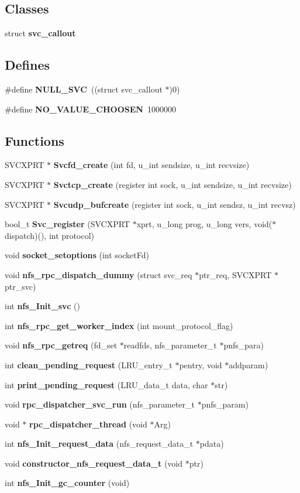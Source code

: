 \subsection*{Classes}
\begin{CompactItemize}
\item 
struct {\bf svc\_\-callout}
\end{CompactItemize}
\subsection*{Defines}
\begin{CompactItemize}
\item 
\#define {\bf NULL\_\-SVC}\ ((struct svc\_\-callout $\ast$)0)
\item 
\#define {\bf NO\_\-VALUE\_\-CHOOSEN}\ 1000000
\end{CompactItemize}
\subsection*{Functions}
\begin{CompactItemize}
\item 
SVCXPRT $\ast$ {\bf Svcfd\_\-create} (int fd, u\_\-int sendsize, u\_\-int recvsize)
\item 
SVCXPRT $\ast$ {\bf Svctcp\_\-create} (register int sock, u\_\-int sendsize, u\_\-int recvsize)
\item 
SVCXPRT $\ast$ {\bf Svcudp\_\-bufcreate} (register int sock, u\_\-int sendsz, u\_\-int recvsz)
\item 
bool\_\-t {\bf Svc\_\-register} (SVCXPRT $\ast$xprt, u\_\-long prog, u\_\-long vers, void($\ast$dispatch)(), int protocol)
\item 
void {\bf socket\_\-setoptions} (int socket\-Fd)
\item 
void {\bf nfs\_\-rpc\_\-dispatch\_\-dummy} (struct svc\_\-req $\ast$ptr\_\-req, SVCXPRT $\ast$ptr\_\-svc)
\item 
int {\bf nfs\_\-Init\_\-svc} ()
\item 
int {\bf nfs\_\-rpc\_\-get\_\-worker\_\-index} (int mount\_\-protocol\_\-flag)
\item 
void {\bf nfs\_\-rpc\_\-getreq} (fd\_\-set $\ast$readfds, nfs\_\-parameter\_\-t $\ast$pnfs\_\-para)
\item 
int {\bf clean\_\-pending\_\-request} (LRU\_\-entry\_\-t $\ast$pentry, void $\ast$addparam)
\item 
int {\bf print\_\-pending\_\-request} (LRU\_\-data\_\-t data, char $\ast$str)
\item 
void {\bf rpc\_\-dispatcher\_\-svc\_\-run} (nfs\_\-parameter\_\-t $\ast$pnfs\_\-param)
\item 
void $\ast$ {\bf rpc\_\-dispatcher\_\-thread} (void $\ast$Arg)
\item 
int {\bf nfs\_\-Init\_\-request\_\-data} (nfs\_\-request\_\-data\_\-t $\ast$pdata)
\item 
void {\bf constructor\_\-nfs\_\-request\_\-data\_\-t} (void $\ast$ptr)
\item 
int {\bf nfs\_\-Init\_\-gc\_\-counter} (void)
\end{CompactItemize}
